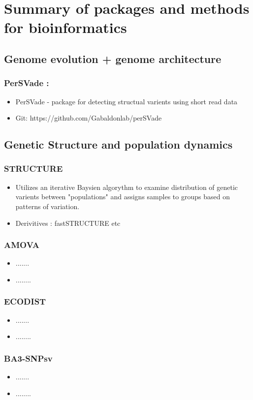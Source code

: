 \documentclass[document.tex]{subfiles}
\begin{document}
\chapter{Summary of packages and methods for bioinformatics}

\label{day:2023-02-15}
\section*{Genome evolution + genome architecture}

\subsection{PerSVade :}
\begin{itemize}
    \item PerSVade - package for detecting structual varients using short read data
    \item Git: https://github.com/Gabaldonlab/perSVade 
    \end{itemize}
   

    \section*{Genetic Structure and population dynamics}
    \subsection{STRUCTURE}
    \begin{itemize}
        \item Utilizes an iterative Baysien algorythm to examine distribution of genetic 
        varients between "populations" and assigns samples to groups based on patterns of 
        variation.
        \item Derivitives : fastSTRUCTURE etc 
        \end{itemize} 
   
        \subsection{AMOVA}
    \begin{itemize}
        \item .......
        \item ........
        \end{itemize} 

        \subsection{ECODIST}
    \begin{itemize}
        \item .......
        \item ........
        \end{itemize} 

        \subsection{BA3-SNPsv}
    \begin{itemize}
        \item .......
        \item ........
        \end{itemize} 
\bib{}
\end{document}
